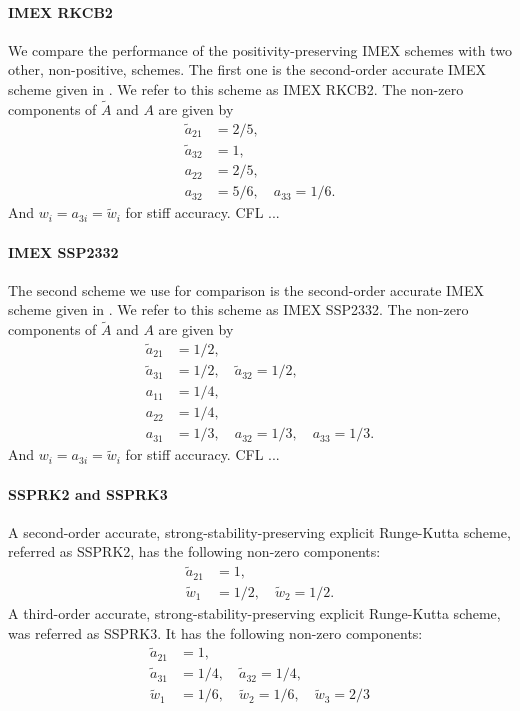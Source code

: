 \paragraph{IMEX RKCB2}

We compare the performance of the positivity-preserving IMEX schemes with two other, non-positive, schemes.  
The first one is the second-order accurate IMEX scheme given in \cite{cavaglieriBewley2015}.  
We refer to this scheme as IMEX RKCB2.  
The non-zero components of $\tilde{A}$ and $A$ are given by
\begin{align}
  \tilde{a}_{21} &= 2/5, \nonumber \\
  \tilde{a}_{32} &= 1, \nonumber \\
  a_{22} &= 2/5, \nonumber \\
  a_{32} &= 5/6, \quad a_{33} = 1/6. \nonumber
\end{align}
And $w_{i} = a_{3i} = \tilde{w}_{i}$ for stiff accuracy.
CFL ...

\paragraph{IMEX SSP2332}

The second scheme we use for comparison is the second-order accurate IMEX scheme given in \cite{pareschiRusso_2005}.  
We refer to this scheme as IMEX SSP2332.  
The non-zero components of $\tilde{A}$ and $A$ are given by
\begin{align}
  \tilde{a}_{21} &= 1/2, \nonumber \\
  \tilde{a}_{31} &= 1/2, \quad \tilde{a}_{32} = 1/2, \nonumber \\
  a_{11} &= 1/4, \nonumber \\
  a_{22} &= 1/4, \nonumber \\
  a_{31} &= 1/3, \quad a_{32} = 1/3, \quad a_{33} = 1/3. \nonumber
\end{align}
And $w_{i} = a_{3i} = \tilde{w}_{i}$ for stiff accuracy.
CFL ...

\paragraph{SSPRK2 and SSPRK3}

A second-order accurate, strong-stability-preserving explicit Runge-Kutta scheme, referred as SSPRK2, has the following non-zero components:
\begin{align}
  \tilde{a}_{21} &= 1, \nonumber \\
  \tilde{w}_{1} &= 1/2, \quad \tilde{w}_{2} = 1/2. \nonumber 
\end{align}
A third-order accurate, strong-stability-preserving explicit Runge-Kutta scheme, was referred as SSPRK3.
It has the following non-zero components:
\begin{align}
  \tilde{a}_{21} &= 1, \nonumber \\
  \tilde{a}_{31} &= 1/4, \quad \tilde{a}_{32} = 1/4, \nonumber \\
  \tilde{w}_{1} &= 1/6, \quad \tilde{w}_{2} = 1/6, \quad \tilde{w}_{3} =2/3 \nonumber
\end{align}